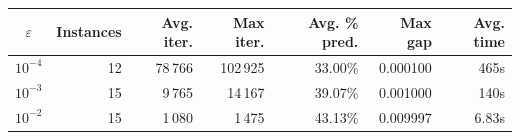 \begin{tabular}{crrrrrr}
\toprule
$\varepsilon$ & Instances & Avg. iter. & Max iter. & Avg. \% pred. & Max gap & Avg. time \\
\midrule
$10^{-4}$ & 12 & 78\,766 & 102\,925 & 33.00\% & 0.000100 & 465s \\
$10^{-3}$ & 15 & 9\,765 & 14\,167 & 39.07\% & 0.001000 & 140s \\
$10^{-2}$ & 15 & 1\,080 & 1\,475 & 43.13\% & 0.009997 & 6.83s \\
\bottomrule
\end{tabular}